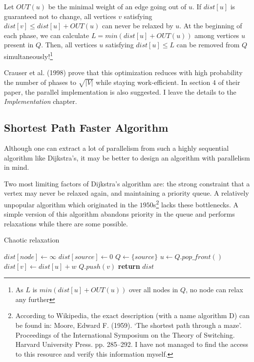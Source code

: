 \documentclass[12pt,a4paper,twoside,openright]{report}
\begin{document}
Let $OUT(u)$ be the minimal weight of an edge going out of $u$. If $dist[u]$ is guaranteed not to change, all vertices $v$ satisfying $dist[v] \leq dist[u] + OUT(u)$ can never be relaxed by $u$. At the beginning of each phase, we can calculate $L = min(dist[u] + OUT(u))$ among vertices $u$ present in $Q$. Then, all vertices $u$ satisfying $dist[u] \leq L$ can be removed from $Q$ simultaneously!\footnote{As $L$ is $min(dist[u] + OUT(u))$ over all nodes in $Q$, no node can relax any further}

Crauser et al. (1998)\cite{dijkstra} prove that this optimization reduces with high probability the number of phases to $\sqrt{|V|}$ while staying work-efficient. In section $4$ of their paper, the parallel implementation is also suggested. I leave the details to the \textit{Implementation} chapter.

\subsection{Shortest Path Faster Algorithm}
Although one can extract a lot of parallelism from such a highly sequential algorithm like Dijkstra's, it may be better to design an algorithm with parallelism in mind. 

Two most limiting factors of Dijkstra's algorithm are: the strong constraint that a vertex may never be relaxed again, and maintaining a priority queue. A relatively unpopular algorithm which originated in the $1950$s\footnote{According to Wikipedia, the exact description (with a name algorithm D) can be found in:  Moore, Edward F. (1959).  `The shortest path through a maze'.  Proceedings of the International Symposium on the Theory of Switching.  Harvard University Press.  pp.  285–292. I have not managed to find the access to this resource and verify this information myself.} lacks these bottlenecks. A simple version of this algorithm abandons priority in the queue and performs relaxations while there are some possible.

\begin{algorithm}
\caption{Chaotic relaxation}\label{chaotic}
\begin{algorithmic}[1]
    \State $dist[node] \gets \infty$
\EndFor
\State $dist[source] \gets 0$
\State $Q \gets \{source\}$ 
        \State $u \gets Q.pop\_front()$
            \State $dist[v] \gets dist[u] + w$
            \State $Q.push(v)$
        \EndIf
      \EndFor
    \EndWhile
\State \textbf{return} $dist$
\EndProcedure
\end{algorithmic}
\end{algorithm}
\end{document}
